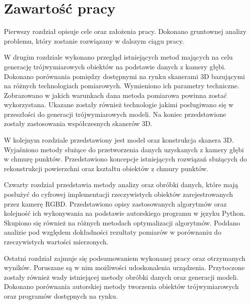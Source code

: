 \section{Zawartość pracy}
Pierwszy rozdział opisuje cele oraz założenia pracy. Dokonano gruntownej analizy problemu, który zostanie rozwiązany w dalszym ciągu pracy.

W drugim rozdziale wykonano przegląd istniejących metod mających na celu generację trójwymiarowych obiektów na podstawie danych z kamery głębi. Dokonano porównania pomiędzy dostępnymi na rynku skanerami 3D bazującymi na różnych technologiach pomiarowych. Wymieniono ich parametry techniczne. Zobrazowano w jakich warunkach dana metoda pomiarowa powinna zostać wykorzystana. Ukazane zostały również technologie jakimi posługiwano się w przeszłości do generacji trójwymiarowych modeli. Na koniec przedstawione zostały zastosowania współczesnych skanerów 3D.

W kolejnym rozdziale przedstawiony jest model oraz konstrukcja skanera 3D. Wyjaśniono metody służące do przetworzenia danych uzyskanych z kamery głębi w chmurę punktów. Przedstawiono koncepcje istniejących rozwiązań służących do rekonstrukcji powierzchni oraz kształtu obiektów z chmury punktów.

Czwarty rozdział przedstawia metody analizy oraz obróbki danych, które mają posłużyć do cyfrowej implementacji rzeczywistych obiektów zarejestrowanych przez kamerę RGBD. Przedstawiono opisy zastosowanych algorytmów oraz kolejność ich wykonywania na podstawie autorskiego programu w języku Python. Skupiono się również na różnych metodach optymalizacji algorytmów. Poddano analizie pod względem dokładności rezultaty pomiarów w porównaniu do rzeczywistych wartości mierzonych.

Ostatni rozdział zajmuje się podsumowaniem wykonanej pracy oraz otrzymanych wyników. Poruszane są w nim możliwości udoskonalenia urządzenia. Przytoczone zostały również wady istniejącej metody obróbki danych oraz generacji modeli. Dokonano porównania autorskiej metody tworzenia obiektów trójwymiarowych oraz programów dostępnych na rynku.

 
